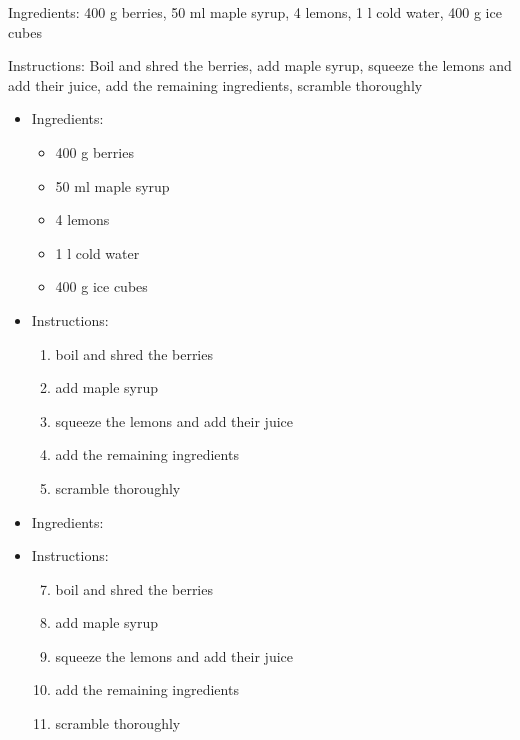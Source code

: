 Ingredients:
400 g berries, 50 ml maple syrup, 4 lemons, 1 l cold water, 400 g ice cubes

\noindent Instructions: Boil and shred the berries, add maple syrup, squeeze the lemons and add their juice, add the remaining ingredients, scramble thoroughly

\begin{itemize}
	\item Ingredients:
	\begin{itemize}
		\item 400 g berries
		\item 50 ml maple syrup 
		\item 4 lemons
		\item 1 l cold water
		\item 400 g ice cubes
	\end{itemize}

	\item Instructions:
	\begin{enumerate}
		\item boil and shred the berries
		\item add maple syrup
		\item squeeze the lemons and add their juice
		\item add the remaining ingredients
		\item scramble thoroughly
	\end{enumerate}
\end{itemize}


\begin{itemize}
	\item Ingredients:

	\item Instructions:
	\begin{enumerate}[label=\roman*]
        \setcounter{enumi}{6}
		\item boil and shred the berries
		\item add maple syrup
		\item squeeze the lemons and add their juice
		\item add the remaining ingredients
		\item scramble thoroughly
	\end{enumerate}
\end{itemize}